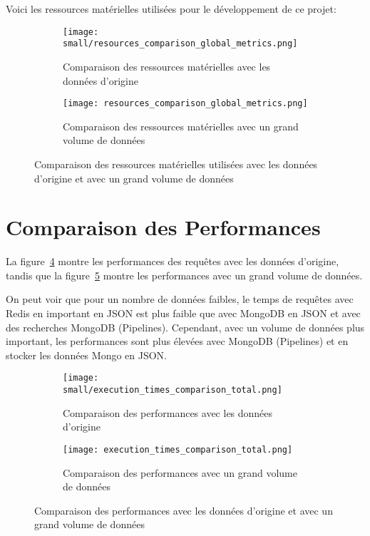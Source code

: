 Voici les ressources matérielles utilisées pour le développement de ce projet:

\begin{figure}[H]
  \centering
  \begin{subfigure}[t]{0.88\textwidth}
    \centering
    \texttt{[image: small/resources\_comparison\_global\_metrics.png]}
    \caption{Comparaison des ressources matérielles avec les données d'origine}
    \label{fig:res_origin}
  \end{subfigure}
  \hfill
  \begin{subfigure}[t]{0.88\textwidth}
    \centering
    \texttt{[image: resources\_comparison\_global\_metrics.png]}
    \caption{Comparaison des ressources matérielles avec un grand volume de données}
    \label{fig:res_total}
  \end{subfigure}
  \caption{Comparaison des ressources matérielles utilisées avec les données d'origine et avec un grand volume de données}
  \label{fig:comparaison_resources}
\end{figure}

\section{Comparaison des Performances}

La figure~\ref{fig:origin} montre les performances des requêtes avec les données d'origine, tandis que la figure~\ref{fig:total} montre les performances avec un grand volume de données.

On peut voir que pour un nombre de données faibles, le temps de requêtes avec Redis en important en JSON est plus faible que avec MongoDB en JSON et avec des recherches MongoDB (Pipelines). Cependant, avec un volume de données plus important, les performances sont plus élevées avec MongoDB (Pipelines) et en stocker les données Mongo en JSON.\@

\begin{figure}[H]
  \centering
  \begin{subfigure}[t]{0.45\textwidth}
    \centering
    \texttt{[image: small/execution\_times\_comparison\_total.png]}
    \caption{Comparaison des performances avec les données d'origine}
    \label{fig:origin}
  \end{subfigure}
  \hfill
  \begin{subfigure}[t]{0.45\textwidth}
    \centering
    \texttt{[image: execution\_times\_comparison\_total.png]}
    \caption{Comparaison des performances avec un grand volume de données}
    \label{fig:total}
  \end{subfigure}
  \caption{Comparaison des performances avec les données d'origine et avec un grand volume de données}
  \label{fig:comparaison_performances}
\end{figure}
